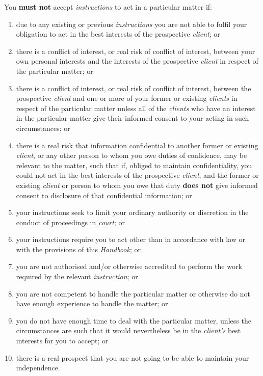 You \textcolor{myred}{\textbf{must not}} accept \emph{instructions} to act in a particular matter
if:
\begin{enumerate}[label=(\arabic*)]
\item due to any existing or previous \emph{instructions} you are not able
to fulfil your obligation to act in the best interests of the
prospective \emph{client}; or

\item there is a conflict of interest, or real risk of conflict of
interest, between your own personal interests and the interests of the
prospective \emph{client} in respect of the particular matter; or

\item there is a conflict of interest, or real risk of conflict of
interest, between the prospective \emph{client} and one or more of your
former or existing \emph{clients} in respect of the particular matter
unless all of the \emph{clients} who have an interest in the particular
matter give their informed consent to your acting in such circumstances;
or

\item there is a real risk that information confidential to another former
or existing \emph{client}, or any other person to whom you owe duties of
confidence, may be relevant to the matter, such that if, obliged to
maintain confidentiality, you could not act in the best interests of the
prospective \emph{client}, and the former or existing \emph{client} or
person to whom you owe that duty \textcolor{myred}{\textbf{does not}} give informed consent to
disclosure of that confidential information; or

\item your instructions seek to limit your ordinary authority or discretion
in the conduct of proceedings in \emph{court}; or

\item your instructions require you to act other than in accordance with
law or with the provisions of this \emph{Handbook}; or

\item you are not authorised and/or otherwise accredited to perform the
work required by the relevant \emph{instruction}; or

\item you are not competent to handle the particular matter or otherwise do
not have enough experience to handle the matter; or

\item you do not have enough time to deal with the particular matter,
unless the circumstances are such that it would nevertheless be in the
\emph{client's} best interests for you to accept; or

\item there is a real prospect that you are not going to be able to
maintain your independence.
\end{enumerate}


